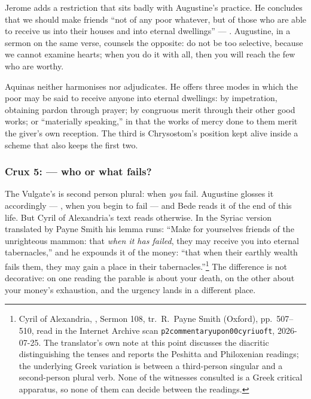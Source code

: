 Jerome adds a restriction that sits badly with Augustine's practice. He
concludes that we should make friends ``not of any poor whatever, but of those
who are able to receive us into their houses and into eternal dwellings'' ---
. Augustine, in
a sermon on the same verse, counsels the opposite: do not be too selective,
because we cannot examine hearts; when you do it with all, then you will reach
the few who are worthy.

Aquinas neither harmonises nor adjudicates. He offers three modes in which the
poor may be said to receive anyone into eternal dwellings: by impetration,
obtaining pardon through prayer; by congruous merit through their other good
works; or ``materially speaking,'' in that the works of mercy done to them
merit the giver's own reception. The third is Chrysostom's position kept alive
inside a scheme that also keeps the first two.

\subsubsection*{Crux 5:  --- who or what fails?}

The Vulgate's  is second person plural: when \emph{you}
fail. Augustine glosses it accordingly --- ,
when you begin to fail --- and Bede reads it of the end of this life. But Cyril
of Alexandria's text reads otherwise. In the Syriac version translated by Payne
Smith his lemma runs: ``Make for yourselves friends of the unrighteous mammon:
that \emph{when it has failed}, they may receive you into eternal
tabernacles,'' and he expounds it of the money: ``that when their earthly
wealth fails them, they may gain a place in their tabernacles.''\footnote{Cyril
of Alexandria, , Sermon 108, tr.\
R.~Payne Smith (Oxford), pp.\ 507--510, read in the Internet Archive scan
\texttt{p2commentaryupon00cyriuoft}, 2026-07-25. The translator's own note at
this point discusses the diacritic distinguishing the tenses and reports the
Peshitta and Philoxenian readings; the underlying Greek variation is between a
third-person singular and a second-person plural verb. None of the witnesses
consulted is a Greek critical apparatus, so none of them can decide between the
readings.} The difference is not
decorative: on one reading the parable is about your death, on the other about
your money's exhaustion, and the urgency lands in a different place.

